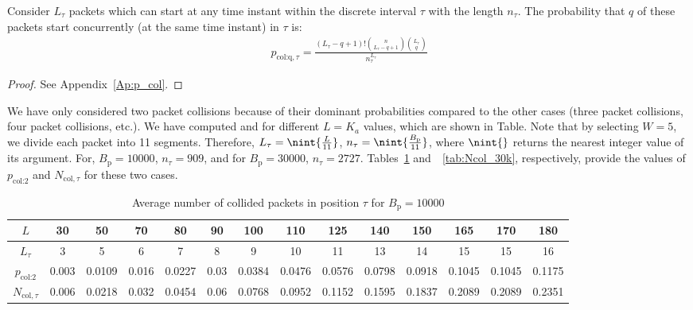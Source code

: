 \documentclass[journal,onecolumn,12pt]{IEEEtran}
\begin{document}
\begin{lemma} Consider $L_{\tau}$ packets which can start at any time instant within the discrete interval $\tau$ with the length $n_\tau$. The probability that $q$ of these packets start concurrently (at the same time instant) in $\tau$ is:
\begin{align}
 p_{\textrm{col:q},\tau} = \frac{(L_{\tau}-q+1)!{\binom{n}{L_{\tau}-q+1}}\binom{L_{\tau}}{q}}{n_{\tau}^{L_{\tau}}}
\label{eq:p_col}
\end{align}
\end{lemma}

\begin{proof}
	See Appendix~\ref{Ap:p_col}.
\end{proof}  

We have only considered two packet collisions because of their dominant probabilities compared to the other cases (three packet collisions, four packet collisions, etc.). We have computed and for different $L=K_a$ values, which are shown in Table. Note that by selecting $W=5$, we divide each packet into 11 segments. Therefore, $L_{\tau}=\nint{\frac{L}{11}}$, $n_{\tau}=\nint{\frac{B_{\text{p}}}{11}}$, where $\nint{}$ returns the nearest integer value of its argument. For, $B_{\text{p}}=10000$, $n_{\tau}=909$, and for $B_{\text{p}}=30000$, $n_{\tau}=2727$. Tables~\ref{tab:Ncol_10k} and~~\ref{tab:Ncol_30k}, respectively, provide the values of $p_{\textrm{col:2}}$ and $N_{\textrm{col},\tau}$ for these two cases.

\begin{table}[!h]
\tiny
\centering
\caption{Average number of collided packets in  position $\tau$ for $B_{\text{p}}=10000$}
\begin{tabular}{| c | c c c c c c c c c c c c c|}
 \hline
 $L$ & 30 & 50 & 70 & 80 & 90 & 100 & 110 & 125 & 140  & 150 & 165 & 170 & 180 \\ 
 \hline
 $L_{\tau}$ & 3 & 5 & 6 & 7 & 8 & 9 & 10 & 11 & 13 & 14 & 15 & 15 & 16 \\
 \hline
 $p_{\textrm{col:2}}$ & 0.003 & 0.0109 & 0.016 & 0.0227 & 0.03 & 0.0384 & 0.0476 & 0.0576 & 0.0798 & 0.0918 & 0.1045 & 0.1045 & 0.1175\\
 \hline
 $N_{\textrm{col},\tau}$ & 0.006 & 0.0218 & 0.032 & 0.0454 & 0.06 & 0.0768 & 0.0952 & 0.1152 & 0.1595 & 0.1837  & 0.2089 & 0.2089 & 0.2351\\
 \hline
\end{tabular} \label{tab:Ncol_10k}
\end{table} 
\end{document}
